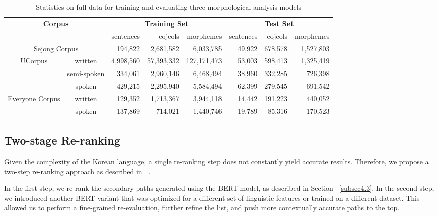 \documentclass[AMS,STIX2COL]{WileyNJD-v2}
\begin{document}
    \begin{table}[]
        \caption{Statistics on full data for training and evaluating three morphological analysis models}\label{tab:data-statistics}
        \centering
        \begin{tabular*}{500pt}{@{\extracolsep\fill}|c|c|rrr|rrr|@{\extracolsep\fill}}
            \toprule
            \multicolumn{2}{|c|}{\multirow{2}{*}{\textbf{Corpus}}} & \multicolumn{3}{c|}{\textbf{Training Set}} & \multicolumn{3}{c|}{\textbf{Test Set}} \\
            \cmidrule{3-5} \cmidrule{6-8}
            \multicolumn{2}{|c|}{~} & sentences & eojeols & morphemes & sentences & eojeols & morphemes \\
            \midrule
            \multicolumn{2}{|c|}{Sejong Corpus} & 194,822 & 2,681,582 & 6,033,785 & 49,922 & 678,578 & 1,527,803 \\
            \midrule
            \multirow{3}{*}{UCorpus}         & written     & 4,998,560 & 57,393,332 & 127,171,473 & 53,003 & 598,413 & 1,325,419 \\
            ~                                & semi-spoken & 334,061   & 2,960,146  & 6,468,494   & 38,960 & 332,285 & 726,398   \\
            ~                                & spoken      & 429,215   & 2,295,940  & 5,584,494   & 62,399 & 279,545 & 691,542   \\
            \midrule
            \multirow{2}{*}{Everyone Corpus} & written     & 129,352   & 1,713,367  & 3,944,118   & 14,442 & 191,223 & 440,052   \\
            ~                                & spoken      & 137,869   & 714,021    & 1,440,746   & 19,789 & 85,316  & 170,523   \\
            \bottomrule
        \end{tabular*}
    \end{table}

    \subsection{Two-stage Re-ranking}\label{subsec4.4}

    Given the complexity of the Korean language, a single re-ranking step does not constantly yield accurate results.
    Therefore, we propose a two-step re-ranking approach as described in ~\cite{Nogueira2019}.

    In the first step, we re-rank the secondary paths generated using the BERT model, as described in Section ~\ref{subsec4.3}.
    In the second step, we introduced another BERT variant that was optimized for a different set of linguistic features or trained on a different dataset.
    This allowed us to perform a fine-grained re-evaluation, further refine the list, and push more contextually accurate paths to the top.
\end{document}
